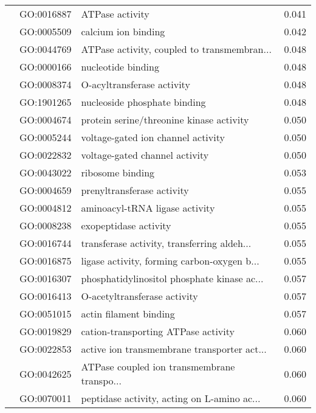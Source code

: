 \begin{longtable}{lllr}
   & GO:0016887 &                              ATPase activity &         0.041 \\
   & GO:0005509 &                          calcium ion binding &         0.042 \\
   & GO:0044769 &  ATPase activity, coupled to transmembran... &         0.048 \\
   & GO:0000166 &                           nucleotide binding &         0.048 \\
   & GO:0008374 &                   O-acyltransferase activity &         0.048 \\
   & GO:1901265 &                 nucleoside phosphate binding &         0.048 \\
   & GO:0004674 &     protein serine/threonine kinase activity &         0.050 \\
   & GO:0005244 &           voltage-gated ion channel activity &         0.050 \\
   & GO:0022832 &               voltage-gated channel activity &         0.050 \\
   & GO:0043022 &                             ribosome binding &         0.053 \\
   & GO:0004659 &                   prenyltransferase activity &         0.055 \\
   & GO:0004812 &               aminoacyl-tRNA ligase activity &         0.055 \\
   & GO:0008238 &                        exopeptidase activity &         0.055 \\
   & GO:0016744 &  transferase activity, transferring aldeh... &         0.055 \\
   & GO:0016875 &  ligase activity, forming carbon-oxygen b... &         0.055 \\
   & GO:0016307 &  phosphatidylinositol phosphate kinase ac... &         0.057 \\
   & GO:0016413 &                 O-acetyltransferase activity &         0.057 \\
   & GO:0051015 &                       actin filament binding &         0.057 \\
   & GO:0019829 &          cation-transporting ATPase activity &         0.060 \\
   & GO:0022853 &  active ion transmembrane transporter act... &         0.060 \\
   & GO:0042625 &  ATPase coupled ion transmembrane transpo... &         0.060 \\
   & GO:0070011 &  peptidase activity, acting on L-amino ac... &         0.060 \\

\end{longtable}
